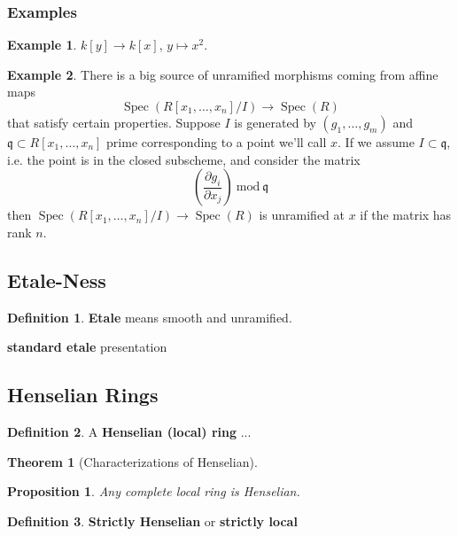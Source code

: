\documentclass[english]{amsart}
\newcommand{\Spec}{\operatorname{Spec}}
\newcommand{\mf}{\mathfrak}
\newtheorem*{thm}{Theorem}
\newtheorem*{prop}{Proposition}
\theoremstyle{definition}
\newtheorem*{defn}{Definition}
\newtheorem*{example}{Example}
\begin{document}
\subsubsection{Examples}

\begin{example}
$k[y] \to k[x]$, $y \mapsto x^2$. 
\end{example}

\begin{example}
There is a big source of unramified morphisms coming from affine maps
\[
\Spec (R[x_1, \dots, x_n]/I) \to \Spec(R)
\]
that satisfy certain properties. Suppose $I$ is generated by $(g_1, \dots, g_m)$ and $\mf{q} \subset R[x_1, \dots, x_n]$ prime corresponding to a point we'll call $x$. If we assume $I \subset \mf{q}$, i.e. the point is in the closed subscheme, and consider the matrix
\[
\left( \frac{\partial g_i}{\partial x_j} \right) \ \text{mod}\ \mf{q} 
\]
then $\Spec(R[x_1, \dots, x_n]/I) \to \Spec (R)$ is unramified at $x$ if the matrix has rank $n$. 

\end{example}



\subsection{Etale-Ness}

\begin{defn}
\textbf{Etale} means smooth and unramified. 
\end{defn}

\textbf{standard etale} presentation

\subsection{Henselian Rings}

\begin{defn}
A \textbf{Henselian (local) ring} ...
\end{defn}

\begin{thm}[Characterizations of Henselian]

\end{thm}

\begin{prop}
Any complete local ring is Henselian. 
\end{prop}

\begin{defn}
\textbf{Strictly Henselian} or \textbf{strictly local}
\end{defn}
\end{document}
